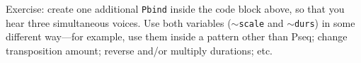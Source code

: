 Exercise: create one additional \texttt{Pbind} inside the code block above, so that you hear three simultaneous voices. Use both variables (\texttt{$\sim$scale} and \texttt{$\sim$durs}) in some different way---for example, use them inside a pattern other than Pseq; change transposition amount; reverse and/or multiply durations; etc.